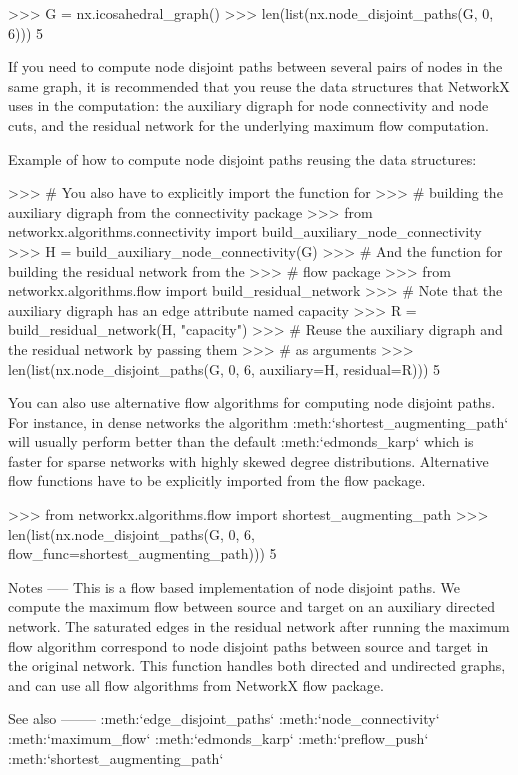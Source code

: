 \begin{DoxyVerb}
>>> G = nx.icosahedral_graph()
>>> len(list(nx.node_disjoint_paths(G, 0, 6)))
5

If you need to compute node disjoint paths between several pairs of
nodes in the same graph, it is recommended that you reuse the
data structures that NetworkX uses in the computation: the
auxiliary digraph for node connectivity and node cuts, and the
residual network for the underlying maximum flow computation.

Example of how to compute node disjoint paths reusing the data
structures:

>>> # You also have to explicitly import the function for
>>> # building the auxiliary digraph from the connectivity package
>>> from networkx.algorithms.connectivity import build_auxiliary_node_connectivity
>>> H = build_auxiliary_node_connectivity(G)
>>> # And the function for building the residual network from the
>>> # flow package
>>> from networkx.algorithms.flow import build_residual_network
>>> # Note that the auxiliary digraph has an edge attribute named capacity
>>> R = build_residual_network(H, "capacity")
>>> # Reuse the auxiliary digraph and the residual network by passing them
>>> # as arguments
>>> len(list(nx.node_disjoint_paths(G, 0, 6, auxiliary=H, residual=R)))
5

You can also use alternative flow algorithms for computing node disjoint
paths. For instance, in dense networks the algorithm
:meth:`shortest_augmenting_path` will usually perform better than
the default :meth:`edmonds_karp` which is faster for sparse
networks with highly skewed degree distributions. Alternative flow
functions have to be explicitly imported from the flow package.

>>> from networkx.algorithms.flow import shortest_augmenting_path
>>> len(list(nx.node_disjoint_paths(G, 0, 6, flow_func=shortest_augmenting_path)))
5

Notes
-----
This is a flow based implementation of node disjoint paths. We compute
the maximum flow between source and target on an auxiliary directed
network. The saturated edges in the residual network after running the
maximum flow algorithm correspond to node disjoint paths between source
and target in the original network. This function handles both directed
and undirected graphs, and can use all flow algorithms from NetworkX flow
package.

See also
--------
:meth:`edge_disjoint_paths`
:meth:`node_connectivity`
:meth:`maximum_flow`
:meth:`edmonds_karp`
:meth:`preflow_push`
:meth:`shortest_augmenting_path`\end{DoxyVerb}
 

